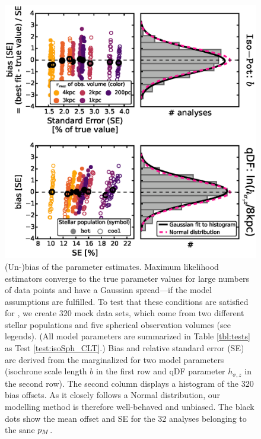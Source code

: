 \begin{figure}[!htbp]
\centering
\includegraphics[width=\columnwidth]{figs/isoSph_CLT_2.eps}
\caption{(Un-)bias of the parameter estimates. Maximum likelihood estimators converge to the true parameter values for large numbers of data points and have a Gaussian spread---if the model assumptions are fulfilled. To test that these conditions are satisfied for \RM{}, we create 320 mock data sets, which come from two different stellar populations and five spherical observation volumes (see legends). (All model parameters are summarized in Table \ref{tbl:tests} as Test \ref{test:isoSph_CLT}.) Bias and relative standard error (SE) are derived from the marginalized \pdf{} for two model parameters (isochrone scale length $b$ in the first row and qDF parameter $h_{\sigma,z}$ in the second row). The second column displays a histogram of the 320 bias offsets. As it closely follows a Normal distribution, our modelling method is therefore well-behaved and unbiased. The black dots show the mean offset and SE for the 32 analyses belonging to the sane $p_M{}$.}
\label{fig:isoSph_CLT}
\end{figure}



